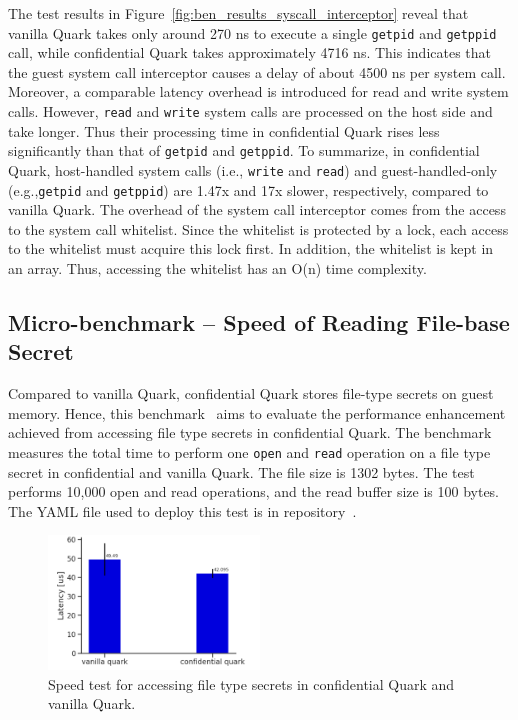 The test results in Figure~\ref{fig:ben_results_syscall_interceptor} reveal that vanilla Quark takes only around 270 ns to execute a single \texttt{getpid} and \texttt{getppid} call, while confidential Quark takes approximately 4716 ns. This indicates that the guest system call interceptor causes a delay of about 4500 ns per system call. Moreover, a 
comparable latency overhead is introduced for read and write system calls. However, \texttt{read} and \texttt{write} system calls are processed on the host side and take longer. Thus their processing time in confidential Quark rises less significantly than that of \texttt{getpid} and \texttt{getppid}. To summarize, in 
confidential Quark, host-handled system calls (i.e., \texttt{write} and \texttt{read}) and guest-handled-only (e.g.,\texttt{getpid} and \texttt{getppid}) are 1.47x and 17x slower, respectively, compared to vanilla Quark. The overhead of the system call interceptor comes from the access to 
the system call whitelist. Since the whitelist is protected by a lock, each access to the whitelist must acquire this lock first. In addition, the whitelist is kept in an array. Thus, accessing the whitelist has an O(n) time complexity.

\subsection{Micro-benchmark – Speed of Reading File-base Secret}
\label{bench_reading_file_secret}

Compared to vanilla Quark, confidential Quark stores file-type secrets on guest memory. Hence, this benchmark~\cite*{benchamark_filebase_secret} aims to evaluate the performance enhancement achieved from accessing file type secrets in confidential Quark. 
The benchmark measures the total time to perform one \texttt{open} and \texttt{read} operation on a file type secret in confidential and vanilla Quark. The file size is 1302 bytes. The test performs 10,000 open and read operations, and the read buffer size is 100 bytes. The YAML file used to deploy this test 
is in repository~\cite*{perf_test_repo}.

\begin{figure}[!htb]
    \centering
    \includegraphics[width=0.5\textwidth]{images/reading_speed_of_file_type_secrets_in_Baseline_and_Cquark.PNG}
    \caption[Speed test for accessing file type secrets in confidential Quark and vanilla Quark]{Speed test for accessing file type secrets in confidential Quark and vanilla Quark.}
    \label{fig:reading_speed_of_file_type_secrets_in_Baseline_and_Cquark}
\end{figure}

